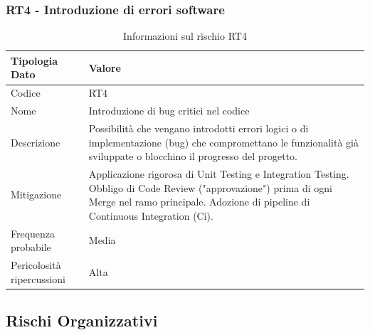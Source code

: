 \documentclass[a4paper,12pt]{article}
\begin{document}
\subsubsection{RT4 - Introduzione di errori software}
\begin{table}[H]
    \centering
    \renewcommand{\arraystretch}{1.4}
    \begin{tabularx}{\textwidth}{|L|Z|}
        \hline
        \textbf{Tipologia Dato} & \textbf{Valore} \\
        \hline
        Codice & RT4 \\
        \hline
        Nome & Introduzione di bug critici nel codice \\
        \hline
        Descrizione & Possibilità che vengano introdotti errori logici o di implementazione (bug) che compromettano le funzionalità già sviluppate o blocchino il progresso del progetto. \\
        \hline
        Mitigazione & Applicazione rigorosa di Unit Testing e Integration Testing. Obbligo di Code Review ("approvazione") prima di ogni Merge nel ramo principale. Adozione di pipeline di Continuous Integration (Ci). \\
        \hline
        Frequenza probabile & Media \\
        \hline
        Pericolosità ripercussioni & Alta \\
        \hline
    \end{tabularx}
    \caption{Informazioni sul rischio RT4}
    \label{tab:RT4}
\end{table}

\subsection{Rischi Organizzativi}\label{sec:rischi_organizzativi}
\end{document}
